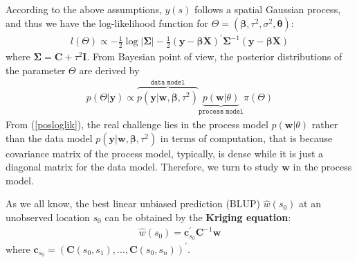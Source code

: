 \documentclass[
12pt, %
a4paper, %
oneside, %
headinclude,footinclude, %
BCOR5mm, %
]{scrartcl}
\begin{document}
According to the above assumptions, $y(s)$ follows a spatial Gaussian process, and thus we have the log-likelihood function for $\Theta = (\boldsymbol{\beta}, \tau^2, \sigma^2, \boldsymbol{\theta}):$
\begin{equation}
\begin{aligned}
l(\Theta) \propto  - \frac{1}{2}\log |\boldsymbol{\Sigma}| - \frac{1}{2}\left(\boldsymbol{y} - \boldsymbol{\beta}\boldsymbol{X}\right)^\prime \boldsymbol{\Sigma}^{- 1}\left(\boldsymbol{y} - \boldsymbol{\beta}\boldsymbol{X}\right)
\end{aligned} \label{loglik}
\end{equation}
where $\boldsymbol{\Sigma} = \boldsymbol{C} + \tau^2\boldsymbol{I}.$ From Bayesian point of view, the posterior distributions of the parameter $\Theta$ are derived by
\begin{equation}
\begin{aligned}
p(\Theta|\boldsymbol{y}) \propto \overbrace{p(\boldsymbol{y}|\boldsymbol{w}, \boldsymbol{\beta}, \tau^2)}^{\texttt{data model}} \underbrace{p(\boldsymbol{w}|\theta)}_{\texttt{process model}}\pi\left(\Theta\right)
\end{aligned} \label{posloglik}
\end{equation}
From (\ref{posloglik}), the real challenge lies in the process model $p(\boldsymbol{w}|\theta)$ rather than the data model $p(\boldsymbol{y}|\boldsymbol{w}, \boldsymbol{\beta}, \tau^2)$ in terms of computation, that is because covariance matrix of the process model, typically, is dense while it is just a diagonal matrix for the data model. Therefore, we turn to study $\boldsymbol{w}$ in the process model.

As we all know, the best linear unbiased prediction (BLUP) $\hat{w}(s_0)$ at an unobserved location $s_0$ can be obtained by the \textbf{Kriging
equation}:
\begin{equation}
\begin{aligned}
\hat{w}(s_0) = \boldsymbol{c}_{s_0}^\prime\boldsymbol{C}^{- 1}\boldsymbol{w}
\end{aligned} \label{Kriging}
\end{equation}
where $\boldsymbol{c}_{s_0} = \left(\boldsymbol{C}(s_0, s_1), \dots, \boldsymbol{C}(s_0, s_n)\right)^\prime$.
\end{document}
